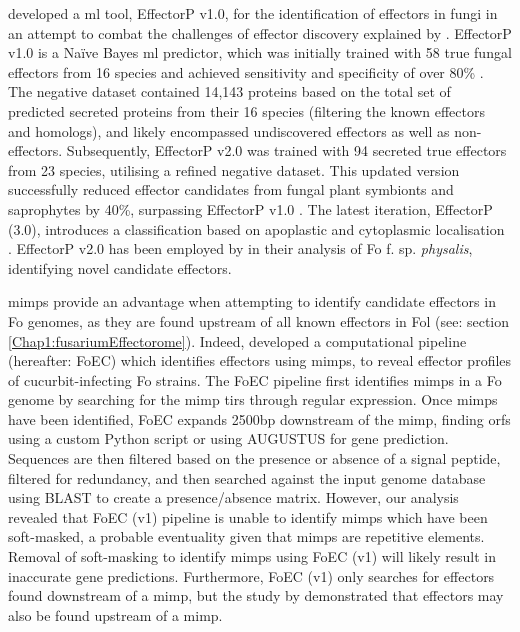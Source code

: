 \textcite{Sperschneider2016} developed a \ac{ml} tool, EffectorP v1.0, for the identification of effectors in fungi in an attempt to combat the challenges of effector discovery explained by \textcite{Sperschneider2015, LoPresti2015}. 
EffectorP v1.0 is a Naïve Bayes \ac{ml} predictor, which was initially trained with 58 true fungal effectors from 16 species and achieved sensitivity and specificity of over 80\% \parencite{Sperschneider2016}. The negative dataset contained 14,143 proteins based on the total set of predicted secreted proteins from their 16 species (filtering the known effectors and homologs), and likely encompassed undiscovered effectors as well as non-effectors. Subsequently, EffectorP v2.0 was trained with 94 secreted true effectors from 23 species, utilising a refined negative dataset. This updated version successfully reduced effector candidates from fungal plant symbionts and saprophytes by 40\%, surpassing EffectorP v1.0 \parencite{Sperschneider2018}. The latest iteration, EffectorP (3.0), introduces a classification based on apoplastic and cytoplasmic localisation \parencite{Sperschneider2022}. EffectorP v2.0 has been employed by \textcite{Simbaqueba2020} in their analysis of \ac{Fo} f. sp. \textit{physalis}, identifying novel candidate effectors.

\Acp{mimp} provide an advantage when attempting to identify candidate effectors in \ac{Fo} genomes, as they are found upstream of all known effectors in \ac{Fol} \parencite{Schmidt2013} (see: section \ref{Chap1:fusariumEffectorome}). Indeed, \textcite{Dam2016} developed a computational pipeline (hereafter: FoEC) which identifies effectors using \acp{mimp}, to reveal effector profiles of cucurbit-infecting \ac{Fo} strains. The FoEC pipeline first identifies \acp{mimp} in a \ac{Fo} genome by searching for the \ac{mimp} \acp{tir} through regular expression. Once \acp{mimp} have been identified, FoEC expands 2500bp downstream of the \ac{mimp}, finding \acp{orf} using a custom Python script or using AUGUSTUS \parencite{Stanke2006} for gene prediction. Sequences are then filtered based on the presence or absence of a signal peptide, filtered for redundancy, and then searched against the input genome database using BLAST to create a presence/absence matrix. However, our analysis revealed that FoEC (v1) pipeline is unable to identify \acp{mimp} which have been soft-masked, a probable eventuality given that \acp{mimp} are repetitive elements. Removal of soft-masking to identify \acp{mimp} using FoEC (v1) will likely result in inaccurate gene predictions. Furthermore, FoEC (v1) only searches for effectors found downstream of a \ac{mimp}, but the study by \textcite{Schmidt2013} demonstrated that effectors may also be found upstream of a \ac{mimp}. 

